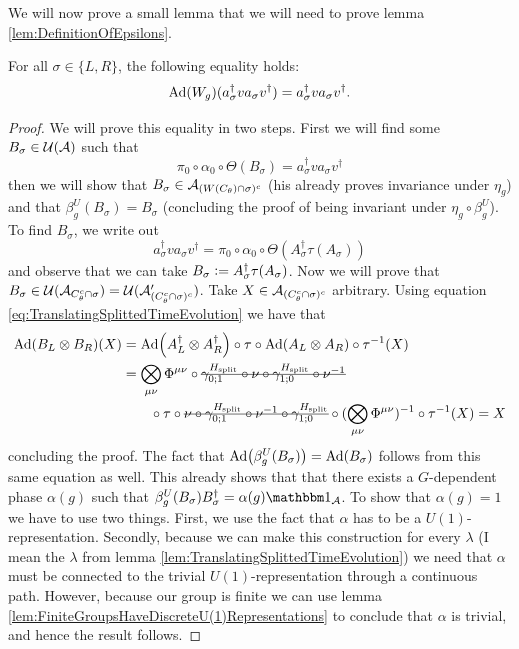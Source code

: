 \documentclass[11pt,a4paper,twoside]{article}
\numberwithin{equation}{section}
\begin{document}
	We will now prove a small lemma that we will need to prove lemma \ref{lem:DefinitionOfEpsilons}.
	\begin{lemma}\label{lem:EqualityTwoTranslationsUsingConnectedPath}
		For all $\sigma\in\{L,R\}$, the following equality holds:
		\begin{equation}
			\Ad{W_g}(a_\sigma^\dagger v a_\sigma v^\dagger)=a_\sigma^\dagger v a_\sigma v^\dagger.
		\end{equation}
	\end{lemma}
	\begin{proof}
		We will prove this equality in two steps. First we will find some $B_\sigma\in\UU(\AA)$ such that
		\begin{equation}
			\pi_0\circ\alpha_0\circ\Theta(B_\sigma)=a_\sigma^\dagger v a_\sigma v^\dagger 
		\end{equation}
		then we will show that $B_\sigma\in\AA_{(W(C_\theta)\cap\sigma)^c}$ (his already proves invariance under $\eta_g$) and that $\beta_g^{U}(B_\sigma)=B_\sigma$ (concluding the proof of being invariant under $\eta_g\circ\beta_g^U$). To find $B_\sigma$, we write out                                                                                                                                                                                                              
		\begin{equation}
			a_\sigma^\dagger v a_\sigma v^\dagger=\pi_0\circ\alpha_0\circ\Theta(A_\sigma^\dagger\tau(A_\sigma))
		\end{equation}
		and observe that we can take $B_\sigma \defeq A_\sigma^\dagger\tau(A_\sigma)$. Now we will prove that $B_\sigma\in\UU(\AA_{C_\theta^c\cap\sigma})=\UU(\AA_{(C_\theta^c\cap\sigma)^c}')$. Take $X\in\AA_{(C_\theta^c\cap\sigma)^c}$ arbitrary. Using equation \eqref{eq:TranslatingSplittedTimeEvolution} we have that
		\begin{align}
			\Ad{B_L\otimes B_R}(X)&=\Ad{A_L^\dagger\otimes A_R^\dagger}\circ\tau\circ\Ad{A_L\otimes A_R}\circ\tau^{-1}(X)\\
			&=\bigotimes_{\mu\nu}\Phi^{\mu\nu}\circ\stkout{\gamma^{\Hsplit}_{0;1}\circ\nu\circ \gamma^{\Hsplit}_{1;0}\circ\nu^{-1}}\\
			\nonumber
			&\qquad\circ\tau\circ\stkout{\nu\circ\gamma^{\Hsplit}_{0;1}\circ\nu^{-1}\circ\gamma^{\Hsplit}_{1;0}}\circ(\bigotimes_{\mu\nu}\Phi^{\mu\nu})^{-1}\circ\tau^{-1}(X)=X
		\end{align}
		concluding the proof. The fact that $\Ad{\beta_g^{U}(B_\sigma)}=\Ad{B_\sigma}$ follows from this same equation as well. This already shows that that there exists a $G$-dependent phase $\alpha(g)$ such that $\beta_g^{U}(B_\sigma)B_\sigma^\dagger=\alpha(g)\id_\AA$. To show that $\alpha(g)=1$ we have to use two things. First, we use the fact that $\alpha$ has to be a $U(1)$-representation. Secondly, because we can make this construction for every $\lambda$ (I mean the $\lambda$ from lemma \ref{lem:TranslatingSplittedTimeEvolution}) we need that $\alpha$ must be connected to the trivial $U(1)$-representation through a continuous path. However, because our group is finite we can use lemma \ref{lem:FiniteGroupsHaveDiscreteU(1)Representations} to conclude that $\alpha$ is trivial, and hence the result follows.
	\end{proof}
\end{document}
